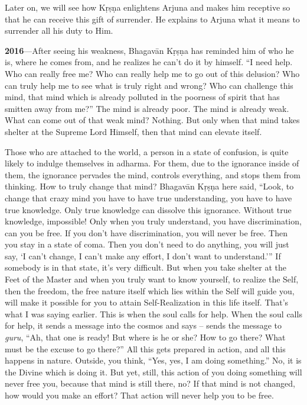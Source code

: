 Later on, we will see how Kṛṣṇa enlightens Arjuna and makes him receptive so that he can receive this gift of surrender. He explains to Arjuna what it means to surrender all his duty to Him.

\textbf{2016}---After seeing his weakness, Bhagavān Kṛṣṇa has reminded him of who he is, where he comes from, and he realizes he can’t do it by himself. “I need help. Who can really free me? Who can really help me to go out of this delusion? Who can truly help me to see what is truly right and wrong? Who can challenge this mind, that mind which is already polluted in the poorness of spirit that has smitten away from me?” The mind is already poor. The mind is already weak. What can come out of that weak mind? Nothing. But only when that mind takes shelter at the Supreme Lord Himself, then that mind can elevate itself.

Those who are attached to the world, a person in a state of confusion, is quite likely to indulge themselves in adharma. For them, due to the ignorance inside of them, the ignorance pervades the mind, controls everything, and stops them from thinking. How to truly change that mind? Bhagavān Kṛṣṇa here said, “Look, to change that crazy mind you have to have true understanding, you have to have true knowledge. Only true knowledge can dissolve this ignorance. Without true knowledge, impossible! Only when you truly understand, you have discrimination, can you be free. If you don’t have discrimination, you will never be free. Then you stay in a state of coma. Then you don’t need to do anything, you will just say, ‘I can’t change, I can’t make any effort, I don’t want to understand.’” If somebody is in that state, it’s very difficult. But when you take shelter at the Feet of the Master and when you truly want to know yourself, to realize the Self, then the freedom, the free nature itself which lies within the Self will guide you, will make it possible for you to attain Self-Realization in this life itself. That’s what I was saying earlier. This is when the soul calls for help. When the soul calls for help, it sends a message into the cosmos and says – sends the message to \textit{guru}, “Ah, that one is ready! But where is he or she? How to go there? What must be the excuse to go there?” All this gets prepared in action, and all this happens in nature. Outside, you think, “Yes, yes, I am doing something.” No, it is the Divine which is doing it. But yet, still, this action of you doing something will never free you, because that mind is still there, no? If that mind is not changed, how would you make an effort? That action will never help you to be free.

